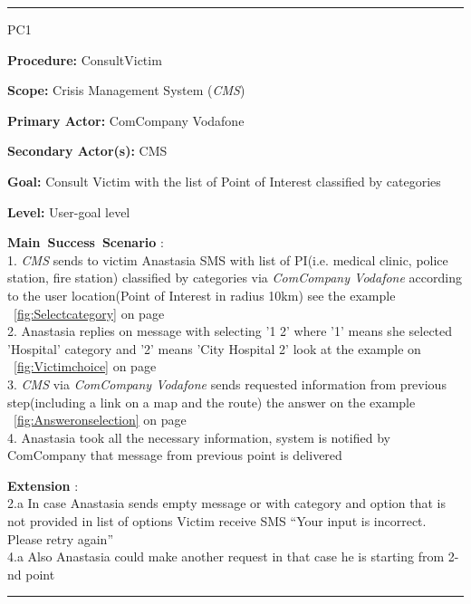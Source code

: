 \vspace{0.5cm}
\hrule
\begin{lyxlist}{PC1}
\small{
\item [\textbf{Procedure:}] ConsultVictim
\item [\textbf{Scope:}] Crisis Management System (\emph{CMS})
\item [\textbf{Primary Actor:}] ComCompany Vodafone
\item [\textbf{Secondary Actor(s):}] CMS
\item [\textbf{Goal:}] Consult Victim with the list of Point of Interest
classified by categories
\item [\textbf{Level:}] User-goal level 

\item [\textbf{Main~Success~Scenario}]:\\
1. \emph{CMS} sends to victim Anastasia SMS with list of PI(i.e. medical clinic,
police station, fire station) classified by categories via \emph{ComCompany Vodafone}
according to the user location(Point of Interest in radius 10km) see the example ~\ref{fig:Selectcategory} on page~\pageref{fig:Selectcategory}\\
2. Anastasia replies on message with selecting '1 2' where '1' means she
selected 'Hospital' category and '2' means 'City Hospital 2'
look at the example on ~\ref{fig:Victimchoice} on
page~\pageref{fig:Victimchoice}\\
3. \emph{CMS} via \emph{ComCompany Vodafone} sends requested information from
previous step(including a link on a map and the route) the answer on the example
~\ref{fig:Answeronselection} on page~\pageref{fig:Answeronselection}\\
4. Anastasia took all the necessary information, system is notified by
ComCompany that message from previous point is delivered\\

\item [\textbf{Extension}]:\\ 
2.a In case Anastasia sends empty message or with category and option that is not
provided in list of options Victim receive SMS ``Your input is incorrect. Please
retry again''\\
4.a Also Anastasia could make another request in that case he is starting from 2-nd
point\\
}
\end{lyxlist}
\hrule
\vspace{0.5cm}

